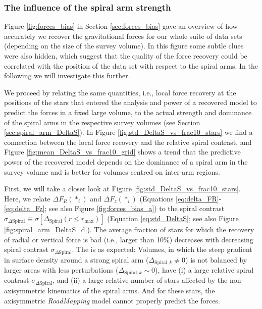\documentclass[iop,revtex4,numberedappendix,appendixfloats]{emulateapj}
\newcommand{\RM}{{\sl RoadMapping}}
\begin{document}
\subsubsection{The influence of the spiral arm strength} \label{sec:spiral_arms_and_forces}

Figure \ref{fig:forces_bias} in Section \ref{sec:forces_bias} gave an overview of how accurately we recover the gravitational forces for our whole suite of data sets (depending on the size of the survey volume). In this figure some subtle clues were also hidden, which suggest that the quality of the force recovery could be correlated with the position of the data set with respect to the spiral arms. In the following we will investigate this further.

We proceed by relating the same quantities, i.e., local force recovery at the positions of the stars that entered the analysis and power of a recovered model to predict the forces in a fixed large volume, to the actual strength and dominance of the spiral arms in the respective survey volumes (see Section \ref{sec:spiral_arm_DeltaS}). In Figure \ref{fig:std_DeltaS_vs_frac10_stars} we find a connection between the local force recovery and the relative spiral contrast, and Figure \ref{fig:mean_DeltaS_vs_frac10_grid} shows a trend that the predictive power of the recovered model depends on the dominance of a spiral arm in the survey volume and is better for volumes centred on inter-arm regions.

First, we will take a closer look at Figure \ref{fig:std_DeltaS_vs_frac10_stars}. Here, we relate $\Delta F_R(*_i)$ and $\Delta F_z(*_i)$ (Equations \eqref{eq:delta_FR}-\eqref{eq:delta_Fz}; see also Figure \ref{fig:forces_bias_a}) to the spiral contrast $\sigma_{\Delta\text{Spiral}} \equiv \sigma[\Delta_\text{Spiral}(r \leq r_\text{max})]$ (Equation \eqref{eq:std_DeltaS}; see also Figure \ref{fig:spiral_arm_DeltaS_d}). The average fraction of stars for which the recovery of radial or vertical force is bad (i.e., larger than 10\%) decreases with decreasing spiral contrast $\sigma_{\Delta\text{Spiral}}$. The is as expected: Volumes, in which the steep gradient in surface density around a strong spiral arm ($\Delta_{\text{Spiral},k} \neq 0$) is not balanced by larger areas with less perturbations ($\Delta_{\text{Spiral},k} \sim 0$), have (i) a large relative spiral contrast $\sigma_{\Delta\text{Spiral}}$, and (ii) a large relative number of stars affected by the non-axisymmetric kinematics of the spiral arms. And for these stars, the axisymmetric \RM{} model cannot properly predict the forces.
\end{document}
